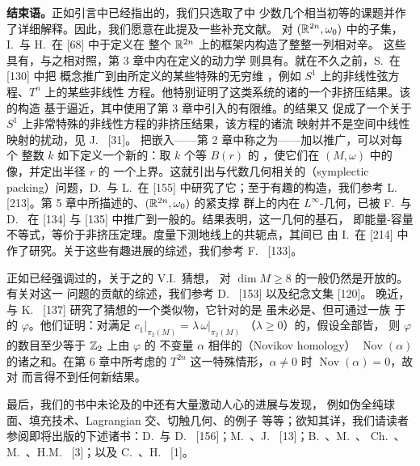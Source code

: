 \textbf{结束语。}\quad 正如引言中已经指出的，我们只选取了\trSymplecticGeometry{}中%
少数几个相当初等的课题并作了详细解释。因此，我们愿意在此提及一些补充文献。%
对 $(\mathbb{R}^{2n},\omega_{0})$ 中的子集，I.~\trEkeland{}与 H.~\trHofer{}在 [68] 中于定义在%
整个 $\mathbb{R}^{2n}$ 上的\trSymplecticDiffeomorphism{}框架内构造了整整一列相对辛\trCapacity。%
这些\trCapacity{}具有\trOuterRegularity，与之相对照，第 3 章中内在定义的动力学%
\trCapacity{}则具有\trInnerRegularity。就在不久之前，S.~\trKuksin{}在 [130] 中把%
\trCapacity{}概念推广到由\trPartialDifferentialEquation{}所定义的某些特殊的无穷维%
\trHamiltonianSystem，例如 $S^{1}$ 上的非线性弦方程、$T^{n}$ 上的某些非线性\trSchrodinger%
方程。他特别证明了这类系统的诸\trFlow{}的一个非挤压结果。该\trCapacity{}的构造%
基于\trGalerkin{}逼近，其中使用了第 3 章中引入的有限维\trCapacity。\trKuksin{}的结果又%
促成了一个关于 $S^{1}$ 上非常特殊的非线性\trSchrodinger{}方程的非挤压结果，该方程的诸流%
映射并不是\trSymplectic\trHilbert{}空间中线性映射的\trCompact{}扰动，见 J.~\trBourgain{} [31]。%
把嵌入\trCapacity{}——第 2 章中称之为\trGromovWidth{}——加以推广，可以对每个%
整数 $k$ 如下定义一个新的\trCapacity：取 $k$ 个等\trBall{} $B(r)$ 的%
\trSymplecticEmbedding，使它们在 $(M,\omega)$ 中的像\trDisjoint，并定出半径 $r$ 的%
一个上界。这就引出与代数几何相关的\textbf{\trSymplectic\trPacking}（symplectic packing）问题，D.~\trMcDuff{}与%
L.~\trPolterovich{}在 [155] 中研究了它；至于有趣的\trPacking{}构造，我们参考%
L.~\trTraynor{} [213]。第 5 章中所描述的、$(\mathbb{R}^{2n},\omega_{0})$ 的紧支撑%
\trHamiltonianMap{}群上的内在 $L^{\infty}$-几何，已被 F.~\trLalonde{}与 D.~\trMcDuff{}%
在 [134] 与 [135] 中推广到一般的\trSymplecticManifold。结果表明，这一几何的基石，%
即能量-容量不等式，等价于非挤压定理。\trHofer{}度量下测地线上的共轭点，其间已%
由 I.~\trUstilovsky{}在 [214] 中作了研究。关于这些有趣进展的综述，我们参考%
F.~\trLalonde{} [133]。

正如已经强调过的，关于\trHamiltonianMap{}之\trFixedPoint{}的 V.I.~\trArnold{}猜想，%
对 $\dim M\geq8$ 的一般\trCompact\trSymplecticManifold{}仍然是开放的。有关\trFloer{}对这一%
问题的贡献的综述，我们参考 D.~\trMcDuff{} [153] 以及\trFloer{}纪念文集 [120]。%
晚近，\trLeHongVan{}与 K.~\trOno{} [137] 研究了\trArnold{}猜想的一个类似物，它针对的是%
虽未必是\trHamiltonianMap{}、但可通过一族\trSymplecticDiffeomorphism{}%
\trIsotopy{}于\trIdentityMap{}的\trSymplecticMapping{} $\varphi$。他们证明：对满足 $c_{1}\bigl|_{\pi_{2}(M)}=\lambda\,\omega\bigl|_{\pi_{2}(M)}$%
（$\lambda\geq0$）的\trCompact\trManifold，假设全部\trFixedPoint{}皆\trNondegenerate，%
则 $\varphi$ 的\trFixedPoint{}数目至少等于 $\mathbb{Z}_{2}$ 上由 $\varphi$ 的\trCalabi{}%
不变量 $\alpha$ 相伴的\textbf{\trNovikov\trHomology}（Novikov homology）%
$\operatorname{Nov}(\alpha)$ 的诸\trBettiNumber{}之和。在第 6 章中所考虑的\trTorus{}%
$T^{2n}$ 这一特殊情形，$\alpha\neq0$ 时 $\operatorname{Nov}(\alpha)=0$，故对\trTorus{}%
而言得不到任何新结果。

最后，我们的书中未论及的\trSymplecticGeometry{}中还有大量激动人心的进展与发现，%
例如伪全纯球面、填充技术、Lagrangian 交、切触几何、\trSymplecticManifold{}的例子%
等等；欲知其详，我们请读者参阅即将出版的下述诸书：D.~\trMcDuff{}与%
D.~\trSalamon{} [156]；M.~\trAudin{}、J.~\trLafontaine{} [13]；B.~\trAebischer{}、M.~\trBorer{}、%
Ch.~\trLeuenberger{}、M.~\trKalin{}、H.M.~\trReimann{} [3]；以及 C.~\trAbbas{}、H.~\trHofer{} [1]。%
